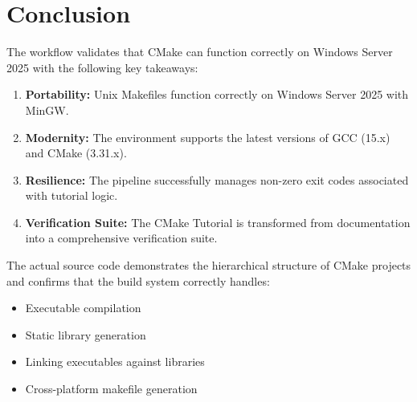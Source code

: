 \section{Conclusion}
The workflow validates that CMake can function correctly on Windows Server 2025 with the following key takeaways:

\begin{enumerate}
    \item \textbf{Portability:} Unix Makefiles function correctly on Windows Server 2025 with MinGW.
    \item \textbf{Modernity:} The environment supports the latest versions of GCC (15.x) and CMake (3.31.x).
    \item \textbf{Resilience:} The pipeline successfully manages non-zero exit codes associated with tutorial logic.
    \item \textbf{Verification Suite:} The CMake Tutorial is transformed from documentation into a comprehensive verification suite.
\end{enumerate}

The actual source code demonstrates the hierarchical structure of CMake projects and confirms that the build system correctly handles:
\begin{itemize}
    \item Executable compilation
    \item Static library generation
    \item Linking executables against libraries
    \item Cross-platform makefile generation
\end{itemize}

